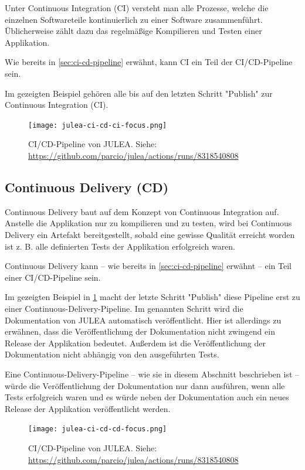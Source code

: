 Unter Continuous Integration (CI) versteht man alle Prozesse, welche die einzelnen Softwareteile kontinuierlich zu einer Software zusammenführt. Üblicherweise zählt dazu das regelmäßige Kompilieren und Testen einer Applikation.

Wie bereits in \cref{sec:ci-cd-pipeline} erwähnt, kann CI ein Teil der CI/CD-Pipeline sein.

Im gezeigten Beispiel gehören alle bis auf den letzten Schritt "Publish" zur Continuous Integration (CI).

\begin{figure}[H]
    \texttt{[image: julea-ci-cd-ci-focus.png]}
    \caption{CI/CD-Pipeline von JULEA. \newline
        Siehe: \url{https://github.com/parcio/julea/actions/runs/8318540808}}
\end{figure}

\pagebreak

\subsection{Continuous Delivery (CD)}

Continuous Delivery baut auf dem Konzept von Continuous Integration auf. Anstelle die Applikation nur zu kompilieren und zu testen, wird bei Continuous Delivery ein Artefakt bereitgestellt, sobald eine gewisse Qualität erreicht worden ist z. B. alle definierten Tests der Applikation erfolgreich waren. 

Continuous Delivery kann – wie bereits in \cref{sec:ci-cd-pipeline} erwähnt – ein Teil einer CI/CD-Pipeline sein. 

Im gezeigten Beispiel in \cref{fig:julea-ci-cd-cd-focus} macht der letzte Schritt "Publish" diese Pipeline erst zu einer Continuous-Delivery-Pipeline. Im genannten Schritt wird die Dokumentation von JULEA automatisch veröffentlicht. Hier ist allerdings zu erwähnen, dass die Veröffentlichung der Dokumentation nicht zwingend ein Release der Applikation bedeutet. Außerdem ist die Veröffentlichung der Dokumentation nicht abhängig von den ausgeführten Tests. 

Eine Continuous-Delivery-Pipeline – wie sie in diesem Abschnitt beschrieben ist – würde die Veröffentlichung der Dokumentation nur dann ausführen, wenn alle Tests erfolgreich waren und es würde neben der Dokumentation auch ein neues Release der Applikation veröffentlicht werden.

\begin{figure}[H]
    \texttt{[image: julea-ci-cd-cd-focus.png]}
    \caption{CI/CD-Pipeline von JULEA. \newline
        Siehe: \url{https://github.com/parcio/julea/actions/runs/8318540808}}
    \label{fig:julea-ci-cd-cd-focus}
\end{figure}

